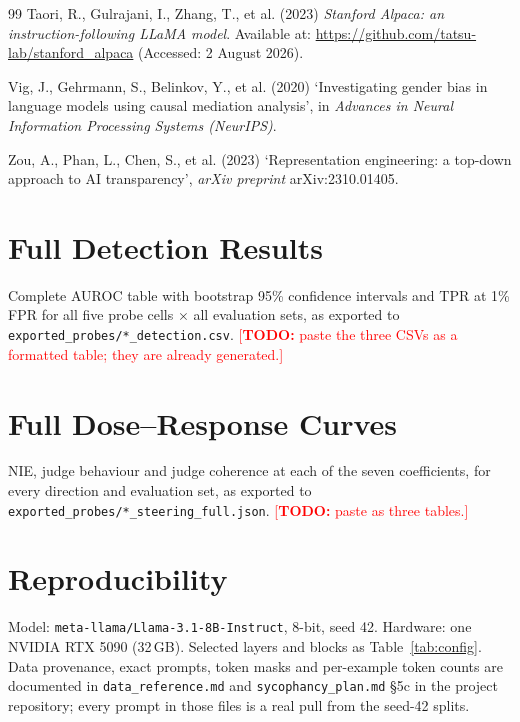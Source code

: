 \documentclass[conference]{IEEEtran}
\newcommand{\TODO}[1]{\textcolor{red}{[\textbf{TODO:} #1]}}
\begin{document}
\begin{thebibliography}{99}
Taori, R., Gulrajani, I., Zhang, T., et al. (2023) \textit{Stanford Alpaca: an
instruction-following LLaMA model}. Available at:
\url{https://github.com/tatsu-lab/stanford_alpaca} (Accessed: 2 August 2026).

Vig, J., Gehrmann, S., Belinkov, Y., et al. (2020) `Investigating gender bias in
language models using causal mediation analysis', in \textit{Advances in Neural
Information Processing Systems (NeurIPS)}.

Zou, A., Phan, L., Chen, S., et al. (2023) `Representation engineering: a
top-down approach to AI transparency', \textit{arXiv preprint} arXiv:2310.01405.

\end{thebibliography}

\appendices

\section{Full Detection Results}
Complete AUROC table with bootstrap 95\% confidence intervals and TPR at 1\%
FPR for all five probe cells $\times$ all evaluation sets, as exported to
\texttt{exported\_probes/*\_detection.csv}.
\TODO{paste the three CSVs as a formatted table; they are already generated.}

\section{Full Dose--Response Curves}
NIE, judge behaviour and judge coherence at each of the seven coefficients, for
every direction and evaluation set, as exported to
\texttt{exported\_probes/*\_steering\_full.json}.
\TODO{paste as three tables.}

\section{Reproducibility}
Model: \texttt{meta-llama/Llama-3.1-8B-Instruct}, 8-bit, seed 42. Hardware:
one NVIDIA RTX 5090 (32\,GB). Selected layers and blocks as
Table~\ref{tab:config}. Data provenance, exact prompts, token masks and
per-example token counts are documented in \texttt{data\_reference.md} and
\texttt{sycophancy\_plan.md} \S5c in the project repository; every prompt in
those files is a real pull from the seed-42 splits.
\end{document}
